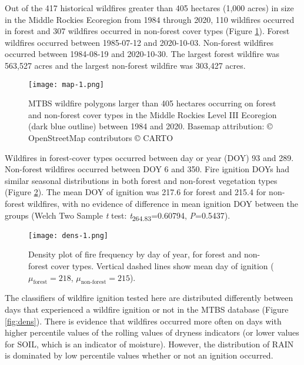 \documentclass[11p]{article}
\begin{document}
Out of the 417 historical wildfires greater than 405 hectares (1,000 acres) in size in the Middle Rockies Ecoregion from 1984 through 2020, 110 wildfires occurred in forest and 307 wildfires occurred in non-forest cover types (Figure \ref{fig:map}). Forest wildfires occurred between 1985-07-12 and 2020-10-03. Non-forest wildfires occurred between 1984-08-19 and 2020-10-30. The largest forest wildfire was 563,527 acres and the largest non-forest wildfire was 303,427 acres.

\begin{figure}[htbp]
  \texttt{[image: map-1.png]}
  \caption{MTBS wildfire polygons larger than 405 hectares occurring on forest and non-forest cover types in the Middle Rockies Level III Ecoregion (dark blue outline) between 1984 and 2020. Basemap attribution: © OpenStreetMap contributors © CARTO}
  \label{fig:map}
\end{figure}

Wildfires in forest-cover types occurred between day or year (DOY) 93 and 289. Non-forest wildfires occurred between DOY 6 and 350. Fire ignition DOYs had similar seasonal distributions in both forest and non-forest vegetation types (Figure \ref{fig:fire-dens}). The mean DOY of ignition was 217.6 for forest and 215.4 for non-forest wildfires, with no evidence of difference in mean ignition DOY between the groups (Welch Two Sample \textit{t} test: \textit{t}\textsubscript{264.83}=0.60794, \textit{P}=0.5437).

\begin{figure}[htbp]
  \texttt{[image: dens-1.png]}
  \caption{Density plot of fire frequency by day of year, for forest and non-forest cover types. Vertical dashed lines show mean day of ignition ($\mu_{\text{forest}} = 218$, $\mu_{\text{non-forest}} = 215$).}
  \label{fig:fire-dens}
\end{figure}

The classifiers of wildfire ignition tested here are distributed differently between days that experienced a wildfire ignition or not in the MTBS database (Figure \ref{fig:dens}). There is evidence that wildfires occurred more often on days with higher percentile values of the rolling values of dryness indicators (or lower values for SOIL, which is an indicator of moisture). However, the distribution of RAIN is dominated by low percentile values whether or not an ignition occurred.  
\end{document}
